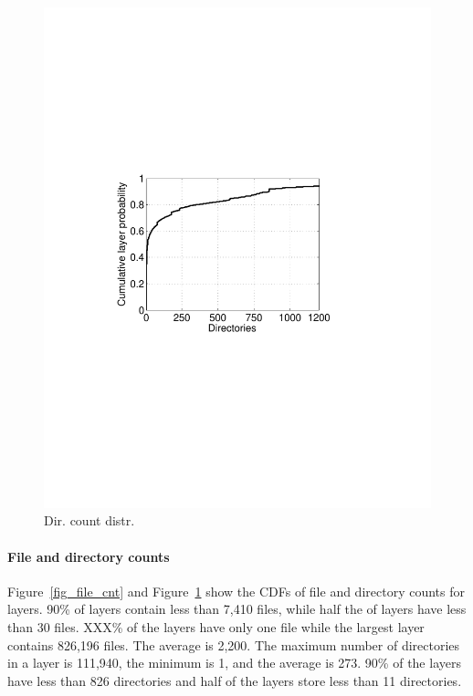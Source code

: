 \begin{figure}
\begin{minipage}{0.23\textwidth}
		\includegraphics[width=1\textwidth]{graphs/dir_cnt.pdf}
		\caption{Dir. count distr.
		}
		\label{fig_dir_cnt}
	\end{minipage}%
\end{figure}
%

\paragraph{File and directory counts}

Figure~\ref{fig_file_cnt} and Figure~\ref{fig_dir_cnt} show the CDFs of file
and directory counts for layers.
%
90\% of layers contain less than 7,410 files, while half the of layers have
less than 30 files.
%
XXX\% of the layers have only one file while the largest layer contains 826,196
files.
%
The average is 2,200.
%
The maximum number of directories in a layer is 111,940, the minimum is 1, and
the average is 273.
%
90\% of the layers have less than 826 directories and half of the layers store
less than 11 directories.
%

